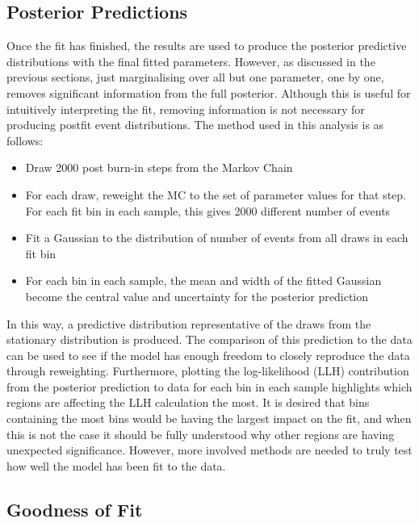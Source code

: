 \subsection{Posterior Predictions}\label{sec:postpred}

Once the fit has finished, the results are used to produce the posterior predictive distributions with the final fitted parameters. However, as discussed in the previous sections, just marginalising over all but one parameter, one by one, removes significant information from the full posterior. Although this is useful for intuitively interpreting the fit, removing information is not necessary for producing postfit event distributions. The method used in this analysis is as follows:

\begin{itemize}
   \item Draw 2000 post burn-in steps from the Markov Chain
   \item For each draw, reweight the MC to the set of parameter values for that step. For each fit bin in each sample, this gives 2000 different number of events
   \item Fit a Gaussian to the distribution of number of events from all draws in each fit bin 
   \item For each bin in each sample, the mean and width of the fitted Gaussian become the central value and uncertainty for the posterior prediction
   \end{itemize}
   
In this way, a predictive distribution representative of the draws from the stationary distribution is produced. The comparison of this prediction to the data can be used to see if the model has enough freedom to closely reproduce the data through reweighting. Furthermore, plotting the log-likelihood (LLH) contribution from the posterior prediction to data for each bin in each sample highlights which regions are affecting the LLH calculation the most. It is desired that bins containing the most bins would be having the largest impact on the fit, and when this is not the case it should be fully understood why other regions are having unexpected significance. However, more involved methods are needed to truly test how well the model has been fit to the data.

\subsection{Goodness of Fit}\label{sec:pval}

